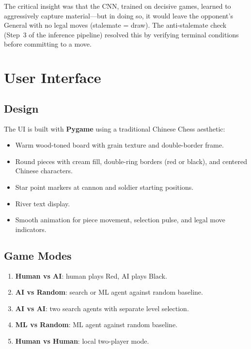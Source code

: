 \documentclass[a4paper,12pt]{article}
\begin{document}
The critical insight was that the CNN, trained on decisive games, learned to aggressively capture material---but in doing so, it would leave the opponent's General with no legal moves (stalemate = draw). The anti-stalemate check (Step~3 of the inference pipeline) resolved this by verifying terminal conditions before committing to a move.


\section{User Interface}

\subsection{Design}

The UI is built with \textbf{Pygame} using a traditional Chinese Chess aesthetic:
\begin{itemize}
    \item Warm wood-toned board with grain texture and double-border frame.
    \item Round pieces with cream fill, double-ring borders (red or black), and centered Chinese characters.
    \item Star point markers at cannon and soldier starting positions.
    \item River text display.
    \item Smooth animation for piece movement, selection pulse, and legal move indicators.
\end{itemize}

\subsection{Game Modes}

\begin{enumerate}
    \item \textbf{Human vs AI}: human plays Red, AI plays Black.
    \item \textbf{AI vs Random}: search or ML agent against random baseline.
    \item \textbf{AI vs AI}: two search agents with separate level selection.
    \item \textbf{ML vs Random}: ML agent against random baseline.
    \item \textbf{Human vs Human}: local two-player mode.
\end{enumerate}
\end{document}
